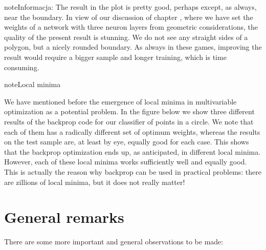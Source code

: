 \documentclass[a4paper,12pt,polish]{jupyterBook}
\begin{document}
\begin{sphinxadmonition}{note}{Informacja:}
\sphinxAtStartPar
The result in the plot is pretty good, perhaps except, as always, near the boundary. In view of our discussion of chapter {\hyperref[\detokenize{docs/more_layers:more-lab}]{}}, where we have set the weights of a network with three neuron layers from geometric considerations, the quality of the present result is stunning. We do not see any straight sides of a polygon, but a nicely rounded boundary. As always in these games, improving the result would require a bigger sample and longer training, which is time consuming.
\end{sphinxadmonition}

\begin{sphinxadmonition}{note}{Local minima}

\sphinxAtStartPar
We have mentioned before the emergence of local minima in multi\sphinxhyphen{}variable optimization as a potential problem. In the figure below we show three different results of the backprop code for our classifier of points in a circle. We note that each of them has a radically different set of optimum weights, whereas the results on the test sample are, at least by eye, equally good for each case. This shows that the backprop optimization ends up, as anticipated, in different local minima. However, each of these local minima works sufficiently well and equally good. This is actually the reason why backprop can be used in practical problems: there are zillions of local minima, but it does not really matter!
\end{sphinxadmonition}
\begin{sphinxVerbatimOutput}

\noindent{}
\end{sphinxVerbatimOutput}


\section{General remarks}
\label{\detokenize{docs/backprop:general-remarks}}
\sphinxAtStartPar
There are some more important and general observations to be made:
\end{document}
